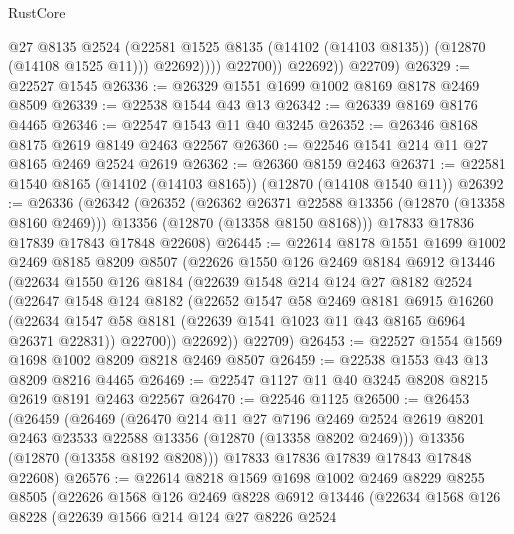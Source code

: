 \begin{lexlean}{RustCore}
\begin{coremodule}
                      @27
                      @8135
                      @2524
                      (@22581 @1525 @8135 (@14102 (@14103 @8135)) (@12870 (@14108 @1525 @11)))
                      @22692))))
              @22700))
          @22692))
      @22709)
@26329 := @22527 @1545
@26336 := @26329 @1551 @1699 @1002 @8169 @8178 @2469 @8509
@26339 := @22538 @1544 @43 @13
@26342 := @26339 @8169 @8176 @4465
@26346 := @22547 @1543 @11 @40 @3245
@26352 := @26346 @8168 @8175 @2619 @8149 @2463 @22567
@26360 := @22546 @1541 @214 @11 @27 @8165 @2469 @2524 @2619
@26362 := @26360 @8159 @2463
@26371 := @22581 @1540 @8165 (@14102 (@14103 @8165)) (@12870 (@14108 @1540 @11))
@26392 := @26336
    (@26342
      (@26352
        (@26362 @26371 @22588 @13356 (@12870 (@13358 @8160 @2469)))
        @13356
        (@12870 (@13358 @8150 @8168)))
      @17833
      @17836
      @17839
      @17843
      @17848
      @22608)
@26445 := @22614
    @8178
    @1551
    @1699
    @1002
    @2469
    @8185
    @8209
    @8507
    (@22626
      @1550
      @126
      @2469
      @8184
      @6912
      @13446
      (@22634
        @1550
        @126
        @8184
        (@22639
          @1548
          @214
          @124
          @27
          @8182
          @2524
          (@22647
            @1548
            @124
            @8182
            (@22652
              @1547
              @58
              @2469
              @8181
              @6915
              @16260
              (@22634 @1547 @58 @8181 (@22639 @1541 @1023 @11 @43 @8165 @6964 @26371 @22831))
              @22700))
          @22692))
      @22709)
@26453 := @22527 @1554 @1569 @1698 @1002 @8209 @8218 @2469 @8507
@26459 := @22538 @1553 @43 @13 @8209 @8216 @4465
@26469 := @22547 @1127 @11 @40 @3245 @8208 @8215 @2619 @8191 @2463 @22567
@26470 := @22546 @1125
@26500 := @26453
    (@26459
      (@26469
        (@26470
          @214
          @11
          @27
          @7196
          @2469
          @2524
          @2619
          @8201
          @2463
          @23533
          @22588
          @13356
          (@12870 (@13358 @8202 @2469)))
        @13356
        (@12870 (@13358 @8192 @8208)))
      @17833
      @17836
      @17839
      @17843
      @17848
      @22608)
@26576 := @22614
    @8218
    @1569
    @1698
    @1002
    @2469
    @8229
    @8255
    @8505
    (@22626
      @1568
      @126
      @2469
      @8228
      @6912
      @13446
      (@22634
        @1568
        @126
        @8228
        (@22639
          @1566
          @214
          @124
          @27
          @8226
          @2524

\end{coremodule}
\end{lexlean}
